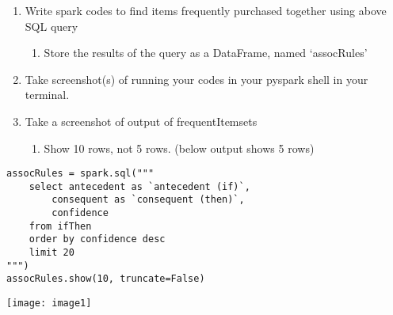 \documentclass[]{article}
\begin{document}
\begin{enumerate}[before=\itshape,label=\arabic*.]
	\item Write spark codes to find items frequently purchased together using above SQL query
	\begin{enumerate}[before=\itshape,label=\alph*.]
		\item Store the results of the query as a DataFrame, named ‘assocRules’
	\end{enumerate}
	\item Take screenshot(s) of running your codes in your pyspark shell in your terminal.
	\item Take a screenshot of output of frequentItemsets
	\begin{enumerate}[before=\itshape,label=\alph*.]
		\item Show 10 rows, not 5 rows. (below output shows 5 rows)
	\end{enumerate}
\end{enumerate} 

\begin{verbatim}
assocRules = spark.sql("""
	select antecedent as `antecedent (if)`, 
		consequent as `consequent (then)`,
		confidence 
	from ifThen 
	order by confidence desc 
	limit 20
""")
assocRules.show(10, truncate=False)
\end{verbatim}
\texttt{[image: image1]}
\end{document}
